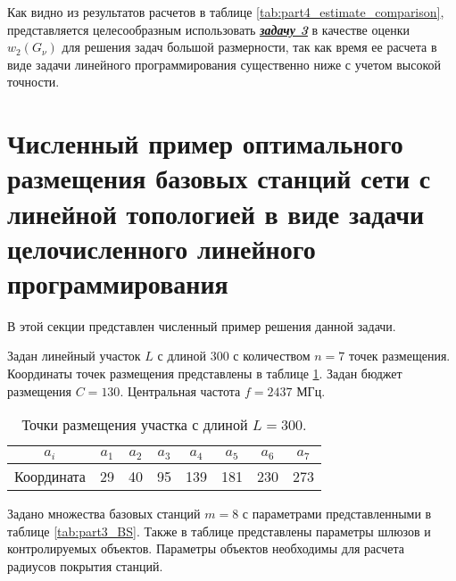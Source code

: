 Как видно из результатов расчетов в таблице \cref{tab:part4_estimate_comparison}, представляется целесообразным  использовать  \underline{\textit{\textbf{задачу 3}}} в качестве оценки $w_2 (G_\nu )$ для решения задач большой размерности, так как время ее расчета в виде задачи линейного программирования существенно ниже с учетом высокой точности.



\section{Численный пример оптимального размещения базовых станций сети с линейной топологией в виде задачи целочисленного линейного программирования}\label{part4:ilp_solution}
В этой секции представлен численный пример решения данной задачи.

Задан линейный участок $L$ с длиной 300 с количеством $n=7$ точек размещения. Координаты точек размещения представлены в таблице \cref{tab:part3_placed_point}.  Задан бюджет размещения $C=130$. Центральная частота $f = 2437$ МГц. 

\begin{table}[h!]\centering
  \begin{tabular}{|c||c|c|c|c|c|c|c|}\hline
    $a_i$ & $a_1$ &  $a_2$ & $a_3$ & $a_4$ & $a_5$ & $a_6$ & $a_7$ \\ \hline \hline
    Координата & 29 & 40 & 95 & 139 & 181 & 230 & 273 \\ \hline
\end{tabular}\caption{Точки размещения участка с длиной $L = 300$.}\label{tab:part3_placed_point}
\end{table}

Задано множества базовых станций $m = 8$ с параметрами представленными в таблице \cref{tab:part3_BS}. Также в таблице представлены параметры шлюзов и контролируемых объектов. Параметры объектов необходимы для расчета радиусов покрытия станций.

